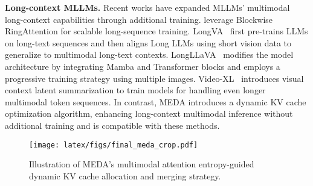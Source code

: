 
\noindent \textbf{Long-context MLLMs.}  
Recent works have expanded MLLMs' multimodal long-context capabilities through additional training. \citet{liu2024world} leverage Blockwise RingAttention for scalable long-sequence training.  LongVA~\cite{zhang2024long} first pre-trains LLMs on long-text sequences and then aligns Long LLMs using short vision data to generalize to multimodal long-text contexts. LongLLaVA~\cite{wang2024longllava} modifies the model architecture by integrating Mamba and Transformer blocks and employs a progressive training strategy using multiple images. Video-XL~\cite{shu2024video} introduces visual context latent summarization to train models for handling even longer multimodal token sequences.
%
In contrast, MEDA introduces a dynamic KV cache optimization algorithm, enhancing long-context multimodal inference without additional training and is compatible with these methods.


\begin{figure*}[ht]
    \centering
    \texttt{[image: latex/figs/final\_meda\_crop.pdf]}
    \caption{\small{ 
Illustration of MEDA's multimodal attention entropy-guided dynamic KV cache allocation and merging strategy.}}
    \label{fig: samplen}
\end{figure*}

